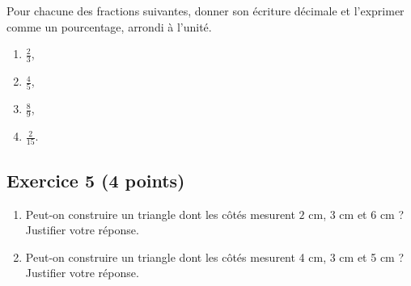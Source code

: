 \documentclass[14 pt]{extarticle}
\theoremstyle{plain}
\begin{document}
Pour chacune des fractions suivantes, donner son écriture décimale et l'exprimer comme un pourcentage, arrondi à l'unité. 
\begin{enumerate}
\item $\displaystyle\frac23$,
\item $\displaystyle\frac45$,
\item $\displaystyle\frac89$,
\item $\displaystyle\frac{2}{15}$. 
\end{enumerate}

\subsection*{Exercice 5 (4 points)}
\begin{enumerate}
\item Peut-on construire un triangle dont les côtés mesurent $2$ cm, 3 cm et 6 cm ? Justifier votre réponse.
\item Peut-on construire un triangle dont les côtés mesurent 4 cm, 3 cm et 5 cm ? Justifier votre réponse.
\end{enumerate}
 	
\end{document}
